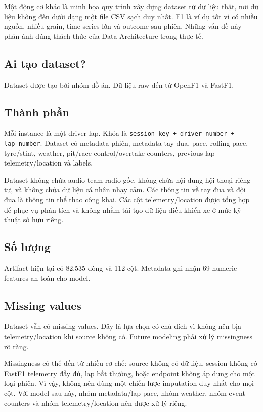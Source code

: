 \documentclass[conference]{IEEEtran}
\begin{document}
Một động cơ khác là minh họa quy trình xây dựng dataset từ dữ liệu thật, nơi dữ liệu không đến dưới dạng một file CSV sạch duy nhất. F1 là ví dụ tốt vì có nhiều nguồn, nhiều grain, time-series lớn và outcome sau phiên. Những vấn đề này phản ánh đúng thách thức của Data Architecture trong thực tế.

\subsection{Ai tạo dataset?}
Dataset được tạo bởi nhóm đồ án. Dữ liệu raw đến từ OpenF1 và FastF1.

\subsection{Thành phần}
Mỗi instance là một driver-lap. Khóa là \texttt{session\_key + driver\_number + lap\_number}. Dataset có metadata phiên, metadata tay đua, pace, rolling pace, tyre/stint, weather, pit/race-control/overtake counters, previous-lap telemetry/location và labels.

Dataset không chứa audio team radio gốc, không chứa nội dung hội thoại riêng tư, và không chứa dữ liệu cá nhân nhạy cảm. Các thông tin về tay đua và đội đua là thông tin thể thao công khai. Các cột telemetry/location được tổng hợp để phục vụ phân tích và không nhằm tái tạo dữ liệu điều khiển xe ở mức kỹ thuật sở hữu riêng.

\subsection{Số lượng}
Artifact hiện tại có 82.535 dòng và 112 cột. Metadata ghi nhận 69 numeric features an toàn cho model.

\subsection{Missing values}
Dataset vẫn có missing values. Đây là lựa chọn có chủ đích vì không nên bịa telemetry/location khi source không có. Future modeling phải xử lý missingness rõ ràng.

Missingness có thể đến từ nhiều cơ chế: source không có dữ liệu, session không có FastF1 telemetry đầy đủ, lap bất thường, hoặc endpoint không áp dụng cho một loại phiên. Vì vậy, không nên dùng một chiến lược imputation duy nhất cho mọi cột. Với model sau này, nhóm metadata/lap pace, nhóm weather, nhóm event counters và nhóm telemetry/location nên được xử lý riêng.
\end{document}
